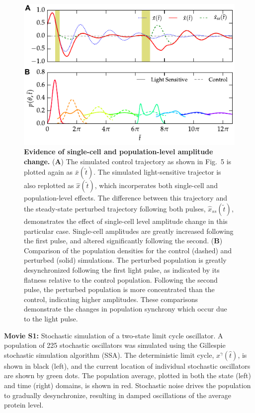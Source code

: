 \documentclass[11pt, letterpaper]{article}
\begin{document}
\begin{figure}[h!]
  \begin{center}
    \includegraphics[width=.75\textwidth]{figures/figure_S4.pdf}
    \caption{
{\bfseries Evidence of single-cell and population-level amplitude change.}
({\bfseries A}) The simulated control trajectory as shown in Fig.~5 is plotted again as $\bar{x}(\tilde{t})$.
The simulated light-sensitive trajector is also replotted as $\hat{x}(\tilde{t})$, which incorperates both single-cell and population-level effects.
The difference between this trajectory and the steady-state perturbed trajectory following both pulses, $\hat{x}_{ss}(\tilde{t})$, demonstrates the effect of single-cell level amplitude change in this particular case. 
Single-cell amplitudes are greatly increased following the first pulse, and altered significantly following the second.
({\bfseries B})
Comparison of the population densities for the control (dashed) and perturbed (solid) simulations.
The perturbed population is greatly desynchronized following the first light pulse, as indicated by its flatness relative to the control population. 
Following the second pulse, the perturbed population is more concentrated than the control, indicating higher amplitudes. 
These comparisons demonstrate the changes in population synchrony which occur due to the light pulse. 
}
\end{center}
\end{figure}

\clearpage
{\bfseries Movie S1:} Stochastic simulation of a two-state limit
cycle oscillator. A population of 225 stochastic oscillators was simulated
using the Gillespie stochastic simulation algorithm (SSA). The deterministic
limit cycle, $x^\gamma(\hat{t})$, is shown in black (left), and the current
location of individual stochastic oscillators are shown by green dots. The
population average, plotted in both the state (left) and time (right) domains,
is shown in red. Stochastic noise drives the population to gradually
desynchronize, resulting in damped oscillations of the average protein level.
\\[2ex]
\end{document}
